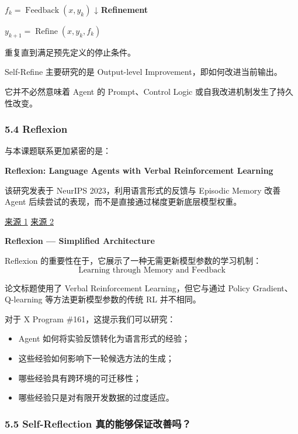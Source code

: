 \(f_k=\operatorname{Feedback}(x,y_k)\) ↓ \textbf{Refinement}

\(y_{k+1}=\operatorname{Refine}(x,y_k,f_k)\)

重复直到满足预先定义的停止条件。

Self-Refine 主要研究的是 Output-level Improvement，即如何改进当前输出。

它并不必然意味着 Agent 的 Prompt、Control Logic 或自我改进机制发生了持久性改变。

\hypertarget{part-3-34-0001-reflexion}{%
\subsubsection{5.4 Reflexion}\label{part-3-34-0001-reflexion}}

与本课题联系更加紧密的是：

\textbf{Reflexion: Language Agents with Verbal Reinforcement Learning}

该研究发表于 NeurIPS 2023，利用语言形式的反馈与 Episodic Memory 改善 Agent 后续尝试的表现，而不是直接通过梯度更新底层模型权重。

\href{https://proceedings.neurips.cc/paper_files/paper/2023/hash/1b44b878bb782e6954cd888628510e90-Abstract-Conference.html}{来源 1} \href{https://arxiv.org/abs/2303.11366}{来源 2}

\textbf{Reflexion --- Simplified Architecture}


Reflexion 的重要性在于，它展示了一种无需更新模型参数的学习机制：
\[\boxed{
\text{Learning through Memory and Feedback}
}\]

论文标题使用了 Verbal Reinforcement Learning，但它与通过 Policy Gradient、Q-learning 等方法更新模型参数的传统 RL 并不相同。

对于 X Program \#161，这提示我们可以研究：

\begin{itemize}
\tightlist
\item
  Agent 如何将实验反馈转化为语言形式的经验；
\item
  这些经验如何影响下一轮候选方法的生成；
\item
  哪些经验具有跨环境的可迁移性；
\item
  哪些经验只是对有限开发数据的过度适应。
\end{itemize}

\hypertarget{part-3-34-0001-self-reflection-ux771fux7684ux80fdux591fux4fddux8bc1ux6539ux5584ux5417}{%
\subsubsection{5.5 Self-Reflection 真的能够保证改善吗？}\label{part-3-34-0001-self-reflection-ux771fux7684ux80fdux591fux4fddux8bc1ux6539ux5584ux5417}}

